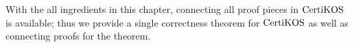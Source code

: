 

With the all ingredients in this chapter, 
connecting all proof pieces in $\mathrm{CertiKOS}$ is available;
thus we provide a single correctness theorem for $\mathrm{CertiKOS}$
as well as connecting proofs
for the theorem.
